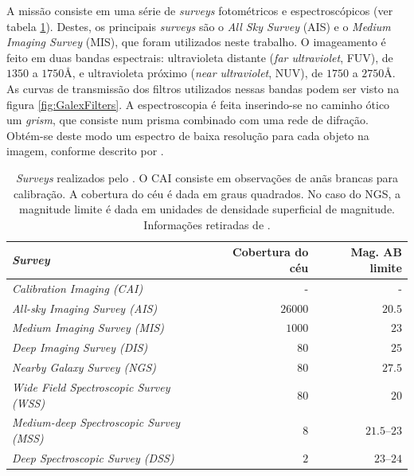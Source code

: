 A missão consiste em uma série de {\em surveys} fotométricos e espectroscópicos
(ver tabela \ref{tab:GalexSurveys}). Destes, os principais {\em surveys} são o
{\em All Sky Survey} (AIS) e o {\em Medium Imaging Survey} (MIS), que foram
utilizados neste trabalho. O imageamento é feito em duas bandas espectrais:
ultravioleta distante ({\em far ultraviolet}, FUV), de $1350$ a $1750$\AA, e
ultravioleta próximo ({\em near ultraviolet}, NUV), de $1750$ a $2750$\AA. As
curvas de transmissão dos filtros utilizados nessas bandas podem ser visto na
figura \ref{fig:GalexFilters}. A espectroscopia é feita inserindo-se no caminho
ótico um {\em grism}, que consiste num prisma combinado com uma rede de
difração. Obtém-se deste modo um espectro de baixa resolução para cada objeto na
imagem, conforme descrito por \citet{Morrissey2007}.

\begin{table}
	\caption[{\em Surveys} realizados pelo \galex.]{{\em Surveys} realizados pelo
	\galex. O CAI consiste em observações de anãs brancas para calibração. A
	cobertura do céu é dada em graus quadrados. No caso do NGS, a magnitude limite
	é dada em unidades de densidade superficial de magnitude. Informações retiradas
	de \citet{Martin2005}.}
	\begin{tabular}{l r r}
		{\em Survey} & Cobertura do céu & Mag. AB limite \\ 
		\midrule
		{\em Calibration Imaging (CAI)}              &       - &            - \\
		{\em All-sky Imaging Survey (AIS)}           & $26000$ &       $20.5$ \\
		{\em Medium Imaging Survey (MIS)}            &  $1000$ &         $23$ \\
		{\em Deep Imaging Survey (DIS)}              &    $80$ &         $25$ \\
		{\em Nearby Galaxy Survey (NGS)}             &    $80$ &       $27.5$ \\
		{\em Wide Field Spectroscopic Survey (WSS)}  &    $80$ &         $20$ \\
		{\em Medium-deep Spectroscopic Survey (MSS)} &     $8$ & $21.5$--$23$ \\
		{\em Deep Spectroscopic Survey (DSS)}        &     $2$ &   $23$--$24$ \\
	\end{tabular}
	\label{tab:GalexSurveys}
\end{table}

